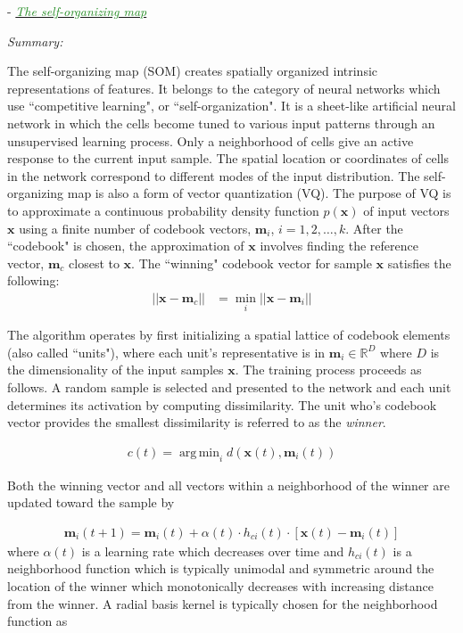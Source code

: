 \documentclass[]{article}
\DeclareMathOperator*{\argmin}{arg\,min}
\newcommand{\paperentry}[4]{
            \hangindent=1cm
            \textcolor{red}{\cite{#1}} - \href{run:../References/#3}{\textcolor{ForestGreen}{\textit{#2}}}
            
            \noindent            
            \begin{minipage}[t]{0.1\linewidth}\hfill\end{minipage}
            \begin{minipage}[t]{0.8\linewidth}\textcolor{NavyBlue}{{\textit{Summary:}}}#4\end{minipage}
            \vspace{.25cm}
          }
\begin{document}
	\paperentry{Kohonen1990SOM}
	{The self-organizing map}
	{Manifold_Representation_Learning/CHL/Kohonen1990SOM.pdf}
	{}
	\newline
	The self-organizing map (SOM) creates spatially organized intrinsic representations of features.  It belongs to the category of neural networks which use ``competitive learning", or ``self-organization".  It is a sheet-like artificial neural network in which the cells become tuned to various input patterns through an unsupervised learning process.  Only a neighborhood of cells give an active response to the current input sample.  The spatial location or coordinates of cells in the network correspond to different modes of the input distribution. The self-organizing map is also a form of vector quantization (VQ).  The purpose of VQ is to approximate a continuous probability density function $p(\bm{x})$ of input vectors $\bm{x}$ using a finite number of codebook vectors, $\bm{m}_i$, $i=1,2,\dots,k$.  After the ``codebook" is chosen, the approximation of $\bm{x}$ involves finding the reference vector, $\bm{m}_c$ closest to $\bm{x}$.  The ``winning" codebook vector for sample $\bm{x}$ satisfies the following:
	\begin{align*}
		|| \bm{x} - \bm{m}_c|| &= \min_{i}|| \bm{x} - \bm{m}_{i} ||
	\end{align*}	
	\noindent
	
	The algorithm operates by first initializing a spatial lattice of codebook elements (also called ``units"), where each unit's representative is in $\bm{m}_i \in \mathbb{R}^{D}$ where $D$ is the dimensionality of the input samples $\bm{x}$.  The training process proceeds as follows.  A random sample is selected and presented to the network and each unit determines its activation by computing dissimilarity.	 The unit who's codebook vector provides the smallest dissimilarity is referred to as the \textit{winner}.
	
	\begin{align*}
		c(t) = \argmin_{i} d(\bm{x}(t),\bm{m}_{i}(t))
	\end{align*}
	\noindent
	
	Both the winning vector and all vectors within a neighborhood of the winner are updated toward the sample by 
	
	\begin{align*}
		\bm{m}_{i}(t+1) = \bm{m}_{i}(t) + \alpha(t) \cdot h_{ci}(t) \cdot [ \bm{x}(t) - \bm{m}_{i}(t) ] 
	\end{align*}
	\noindent
	where $\alpha(t)$ is a learning rate which decreases over time and $h_{ci}(t)$ is a neighborhood function which is typically unimodal and symmetric around the location of the winner which monotonically decreases with increasing distance from the winner.  A radial basis kernel is typically chosen for the neighborhood function as 
	
\end{document}
